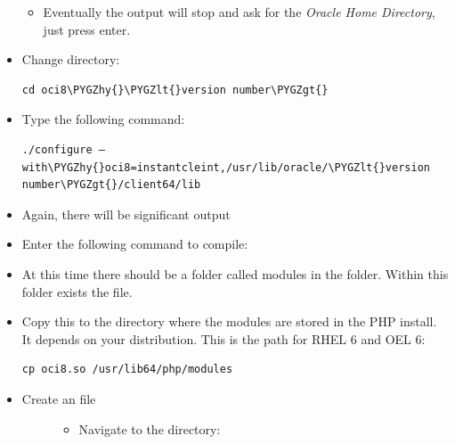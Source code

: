 \documentclass[letterpaper,10pt,english]{sphinxmanual}
\def\PYGZlt{\char`\<}
\def\PYGZgt{\char`\>}
\def\PYGZhy{\char`\-}
\begin{document}
\begin{itemize}
\begin{description}
\end{description}
\begin{itemize}
\item {} 
Eventually the output will stop and ask for the \emph{Oracle Home Directory}, just press enter.

\end{itemize}

\item {} 
Change directory:

\begin{Verbatim}[commandchars=\\\{\}]
cd oci8\PYGZhy{}\PYGZlt{}version number\PYGZgt{}
\end{Verbatim}

\item {} 
Type the following command:

\begin{Verbatim}[commandchars=\\\{\}]
./configure –with\PYGZhy{}oci8=instantcleint,/usr/lib/oracle/\PYGZlt{}version number\PYGZgt{}/client64/lib
\end{Verbatim}

\item {} 
Again, there will be significant output

\item {} 
Enter the following command to compile: 

\item {} 
At this time there should be a folder called modules in the  folder.
Within this folder exists the  file.

\item {} 
Copy this to the directory where the modules are stored in the PHP install. It depends on
your distribution. This is the path for RHEL 6 and OEL 6:

\begin{Verbatim}[commandchars=\\\{\}]
cp oci8.so /usr/lib64/php/modules
\end{Verbatim}

\item {} \begin{description}
\item[{Create an  file}] \leavevmode\begin{itemize}
\item {} 
Navigate to the  directory: 


\end{itemize}
\end{description}
\end{itemize}
\end{document}
